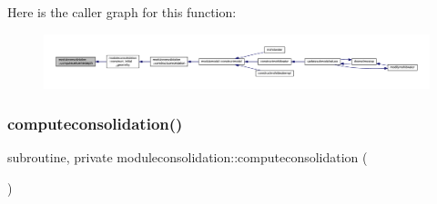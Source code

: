 Here is the caller graph for this function\+:\nopagebreak
\begin{figure}[H]
\begin{center}
\leavevmode
\includegraphics[width=350pt]{namespacemoduleconsolidation_a3620cbc84f4868b17ace877ad56c903e_icgraph}
\end{center}
\end{figure}
\mbox{\label{namespacemoduleconsolidation_ad7db155588df8bc22ff9b3934aff50f7}} 
\subsubsection{\texorpdfstring{computeconsolidation()}{computeconsolidation()}}
{\footnotesize\ttfamily subroutine, private moduleconsolidation\+::computeconsolidation (\begin{DoxyParamCaption}{ }\end{DoxyParamCaption})\hspace{0.3cm}{\ttfamily [private]}}

